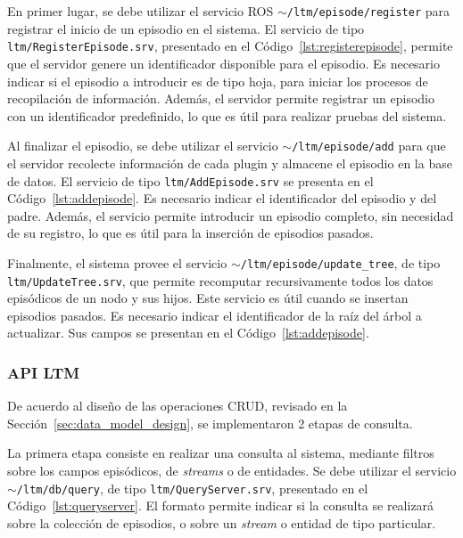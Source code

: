 En primer lugar, se debe utilizar el servicio ROS \texttt{$\sim$/ltm/episode/register} para registrar el inicio de un episodio en el sistema. El servicio de tipo \texttt{ltm/RegisterEpisode.srv}, presentado en el Código~\ref{lst:registerepisode}, permite que el servidor genere un identificador disponible para el episodio. Es necesario indicar si el episodio a introducir es de tipo hoja, para iniciar los procesos de recopilación de información.  Además, el servidor permite registrar un episodio con un identificador predefinido, lo que es útil para realizar pruebas del sistema.
\lstset{style=/Style/ROS/MSG}


Al finalizar el episodio, se debe utilizar el servicio \texttt{$\sim$/ltm/episode/add} para que el servidor recolecte información de cada plugin y almacene el episodio en la base de datos. El servicio de tipo \texttt{ltm/AddEpisode.srv} se presenta en el Código~\ref{lst:addepisode}. Es necesario indicar el identificador del episodio y del padre. Además, el servicio permite introducir un episodio completo, sin necesidad de su registro, lo que es útil para la inserción de episodios pasados.
\lstset{style=/Style/ROS/MSG}


Finalmente, el sistema provee el servicio \texttt{$\sim$/ltm/episode/update\_tree}, de tipo \texttt{ltm/UpdateTree.srv}, que permite recomputar recursivamente todos los datos episódicos de un nodo y sus hijos. Este servicio es útil cuando se insertan episodios pasados. Es necesario indicar el identificador de la raíz del árbol a actualizar. Sus campos se presentan en el Código~\ref{lst:addepisode}.
\lstset{style=/Style/ROS/MSG}


\subsubsection{API LTM}

De acuerdo al diseño de las operaciones CRUD, revisado en la Sección~\ref{sec:data_model_design}, se implementaron 2 etapas de consulta.

La primera etapa consiste en realizar una consulta al sistema, mediante filtros sobre los campos episódicos, de \textit{streams} o de entidades. Se debe utilizar el servicio \texttt{$\sim$/ltm/db/query}, de tipo \texttt{ltm/QueryServer.srv}, presentado en el Código~\ref{lst:queryserver}. El formato permite indicar si la consulta se realizará sobre la colección de episodios, o sobre un \textit{stream} o entidad de tipo particular. 
\lstset{style=/Style/ROS/MSG}


